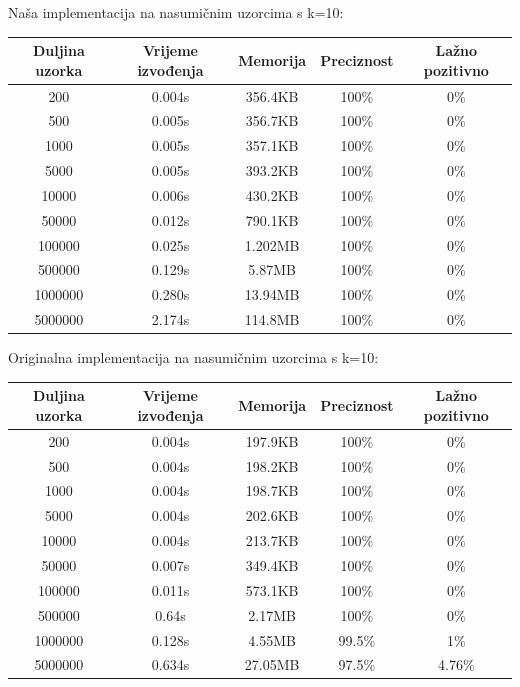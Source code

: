 \documentclass[seminarskirad]{fer}
\begin{document}
Naša implementacija na nasumičnim uzorcima s k=10:
\begin{center}
	\small
	\begin{tabular}{||c c c c c||} 
		\hline
		Duljina uzorka & Vrijeme izvođenja & Memorija & Preciznost & Lažno pozitivno \\ [0.5ex] 
		\hline\hline
		200 & 0.004s & 356.4KB & 100\% & 0\% \\ 
		\hline
		500 & 0.005s & 356.7KB & 100\% & 0\% \\
		\hline
		1000 & 0.005s & 357.1KB & 100\% & 0\% \\
		\hline
		5000 & 0.005s & 393.2KB & 100\% & 0\% \\
		\hline
		10000 & 0.006s & 430.2KB & 100\% & 0\% \\
		\hline
		50000 & 0.012s & 790.1KB & 100\% & 0\% \\ 
		\hline
		100000 & 0.025s & 1.202MB & 100\% & 0\% \\
		\hline
		500000 & 0.129s & 5.87MB & 100\% & 0\% \\
		\hline
		1000000 & 0.280s & 13.94MB & 100\% & 0\% \\
		\hline
		5000000 & 2.174s & 114.8MB & 100\% & 0\% \\ [1ex] 
		\hline
	\end{tabular}
\end{center}

Originalna implementacija na nasumičnim uzorcima s k=10:

\begin{center}
	\small
	\begin{tabular}{||c c c c c||} 
		\hline
		Duljina uzorka & Vrijeme izvođenja & Memorija & Preciznost & Lažno pozitivno \\ [0.5ex] 
		\hline\hline
		200 & 0.004s & 197.9KB & 100\% & 0\% \\ 
		\hline
		500 & 0.004s & 198.2KB & 100\% & 0\% \\
		\hline
		1000 & 0.004s & 198.7KB & 100\% & 0\% \\
		\hline
		5000 & 0.004s & 202.6KB & 100\% & 0\% \\
		\hline
		10000 & 0.004s & 213.7KB & 100\% & 0\% \\
		\hline
		50000 & 0.007s & 349.4KB & 100\% & 0\% \\ 
		\hline
		100000 & 0.011s & 573.1KB & 100\% & 0\% \\
		\hline
		500000 & 0.64s & 2.17MB & 100\% & 0\% \\
		\hline
		1000000 & 0.128s & 4.55MB & 99.5\% & 1\% \\
		\hline
		5000000 & 0.634s & 27.05MB & 97.5\% & 4.76\% \\ [1ex] 
		\hline
	\end{tabular}
\end{center}
\end{document}

